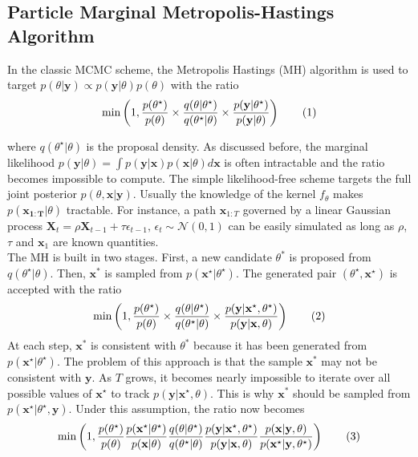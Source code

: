 \documentclass[11pt,a4,twosided,singlespacing,titlepagenumber=on]{scrreprt}
\numberwithin{equation}{chapter} %
\theoremstyle{remark}
\newcommand{\matr}[1]{\mathbf{#1}}
\newcommand\numberthis{\addtocounter{equation}{1}\tag{\theequation}}
\begin{document}
\subsection{Particle Marginal Metropolis-Hastings Algorithm}
\label{section:mcmc_pmmh}

In the classic MCMC scheme, the Metropolis Hastings (MH) algorithm is used to target $p(\theta| \matr{y}) \propto p(\matr{y}|\theta)p(\theta)$ with the ratio
\begin{align*}
\min \left( 1, \frac{p(\theta^\star)}{p(\theta)} \times  \frac{q(\theta|\theta^\star)}{q(\theta^\star|\theta)} \times \frac{p({\matr{y}}|\theta^\star)}{p({\matr{y}}|\theta)} \right) \numberthis \label{classic_mcmc_target}
\end{align*}

where $q(\theta^\star|\theta)$ is the proposal density. As discussed before, the marginal likelihood $p(\matr{y}|\theta) = \int p(\matr{y}|\matr{x})p(\matr{x}|\theta) d\matr{x}$ is often intractable and the ratio becomes impossible to compute. The simple likelihood-free scheme targets the full joint posterior $p(\theta,\matr{x}|\matr{y})$. Usually the knowledge of the kernel $f_\theta$ makes $p(\matr{x_{1:T}}|\theta)$ tractable. For instance, a path $\matr{x}_{1:T}$ governed by a linear Gaussian process $\matr{X}_t = \rho \matr{X}_{t-1} + \tau \epsilon_{t-1} \text{, } \epsilon_t \sim \mathcal{N}(0,1)$ can be easily simulated as long as $\rho$, $\tau$ and $\matr{x}_1$ are known quantities. \\ 

The MH is built in two stages. First, a new candidate $\theta^*$ is proposed from $q(\theta^\star|\theta)$. Then, $\matr{x}^*$ is sampled from $p(\matr{x}^\star|\theta^\star)$. The generated pair $(\theta^\star,\matr{x}^\star)$ is accepted with the ratio
\begin{align*}
\min \left( 1, \frac{p(\theta^\star)}{p(\theta)} \times  \frac{q(\theta|\theta^\star)}{q(\theta^\star|\theta)} \times \frac{p(\matr{y}|{\matr{x}}^\star,\theta^\star)}{p(\matr{y}|{\matr{x}},\theta)} \right) \numberthis
\end{align*}
At each step, $\matr{x}^*$ is consistent with $\theta^*$ because it has been generated from $p(\matr{x}^\star|\theta^\star)$. The problem of this approach is that the sample $\matr{x}^*$ may not be consistent with $\matr{y}$. As $T$ grows, it becomes nearly impossible to iterate over all possible values of $\matr{x}^\star$ to track $p(\matr{y}|\matr{x}^\star,\theta)$. This is why $\matr{x}^*$ should be sampled from $p(\matr{x}^\star|\theta^\star,\matr{y})$. Under this assumption, the ratio now becomes
\begin{align*}
 \min \left(1, \frac{p(\theta^\star)}{p(\theta)}   \frac{p({\matr{x}}^\star|\theta^\star)}{p({\matr{x}}|\theta)}   \frac{q(\theta|\theta^\star)}{q(\theta^\star|\theta)}   \frac{p(\matr{y}|{\matr{x}}^\star,\theta^\star)}{p(\matr{y}|{\matr{x}},\theta)}  \frac{p({\matr{x}}|\matr{y},\theta)}{p({\matr{x}}^\star|\matr{y},\theta^\star)} \right) \numberthis
\end{align*}
\end{document}
